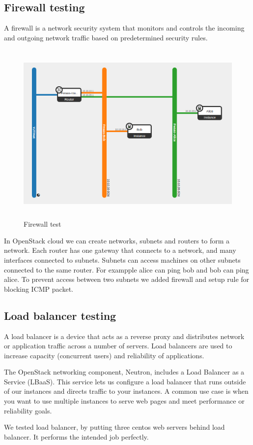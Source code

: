         \subsection{Firewall testing}
        \par A firewall is a network security system that monitors and controls the incoming and outgoing network traffic based on predetermined security rules.
        
        \begin{figure}[h]
            \centering
            \includegraphics[width=13cm,height=9cm]{images/fwaas.png}
            \caption{Firewall test}
        \end{figure}
        
        \par In OpenStack cloud we can create networks, subnets and routers to form a network. Each router has one gateway that connects to a network, and many interfaces connected to subnets. Subnets can access machines on other subnets connected to the same router. For exampple alice can ping bob and bob can ping alice. To prevent access between two subnets we added firewall and setup rule for blocking ICMP packet. 
        
        \subsection{Load balancer testing}
        \par A load balancer is a device that acts as a reverse proxy and distributes network or application traffic across a number of servers. Load balancers are used to increase capacity (concurrent users) and reliability of applications.
        
        \par The OpenStack networking component, Neutron, includes a Load Balancer as a Service (LBaaS). This service lets us configure a load balancer\cite{lb} that runs outside of our instances and directs traffic to your instances. A common use case is when you want to use multiple instances to serve web pages and meet performance or reliability goals.
        
        \par We tested load balancer, by putting three centos web servers behind load balancer. It performs the intended job perfectly.